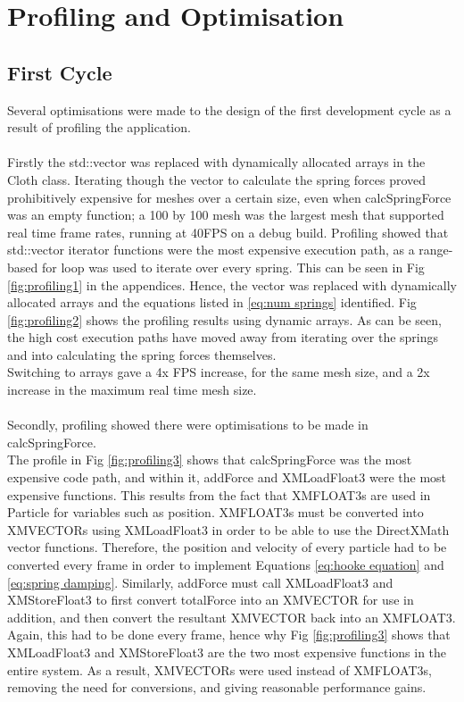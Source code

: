 \section{Profiling and Optimisation}
\label{sec:optimisation}

\subsection{First Cycle}
\doublespaced
Several optimisations were made to the design of the first development cycle as a result of profiling the application.
\\\\Firstly the std::vector was replaced with dynamically allocated arrays in the Cloth class. Iterating though the vector to calculate the spring forces proved prohibitively expensive for meshes over a certain size, even when calcSpringForce was an empty function; a 100 by 100 mesh was the largest mesh that supported real time frame rates, running at 40FPS on a debug build. Profiling showed that std::vector iterator functions were the most expensive execution path, as a range-based for loop was used to iterate over every spring. This can be seen in Fig \ref{fig:profiling1} in the appendices. Hence, the vector was replaced with dynamically allocated arrays and the equations listed in \ref{eq:num springs} identified. Fig \ref{fig:profiling2} shows the profiling results using dynamic arrays. As can be seen, the high cost execution paths have moved away from iterating over the springs and into calculating the spring forces themselves.
\\Switching to arrays gave a 4x FPS increase, for the same mesh size, and a 2x increase in the maximum real time mesh size.
\\\\Secondly, profiling showed there were optimisations to be made in calcSpringForce.
\\The profile in Fig \ref{fig:profiling3} shows that calcSpringForce was the most expensive code path, and within it, addForce and XMLoadFloat3 were the most expensive functions. This results from the fact that XMFLOAT3s are used in Particle for variables such as position. XMFLOAT3s must be converted into XMVECTORs using XMLoadFloat3 in order to be able to use the DirectXMath vector functions. Therefore, the position and velocity of every particle had to be converted every frame in order to implement Equations \ref{eq:hooke equation} and \ref{eq:spring damping}. Similarly, addForce must call XMLoadFloat3 and XMStoreFloat3 to first convert totalForce into an XMVECTOR for use in addition, and then convert the resultant XMVECTOR back into an XMFLOAT3. Again, this had to be done every frame, hence why Fig \ref{fig:profiling3} shows that XMLoadFloat3 and XMStoreFloat3 are the two most expensive functions in the entire system. As a result, XMVECTORs were used instead of XMFLOAT3s, removing the need for conversions, and giving reasonable performance gains.
